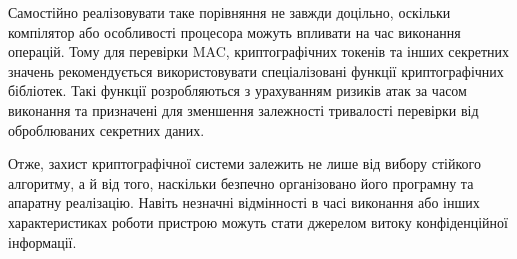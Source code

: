 Самостійно реалізовувати таке порівняння не завжди доцільно, оскільки компілятор або особливості процесора можуть впливати на час виконання операцій. 
Тому для перевірки MAC, криптографічних токенів та інших секретних значень рекомендується використовувати спеціалізовані функції криптографічних бібліотек. 
Такі функції розробляються з урахуванням ризиків атак за часом виконання та призначені для зменшення залежності тривалості перевірки від оброблюваних секретних даних.

Отже, захист криптографічної системи залежить не лише від вибору стійкого алгоритму, а й від того, наскільки безпечно організовано його програмну та апаратну реалізацію. 
Навіть незначні відмінності в часі виконання або інших характеристиках роботи пристрою можуть стати джерелом витоку конфіденційної інформації.

